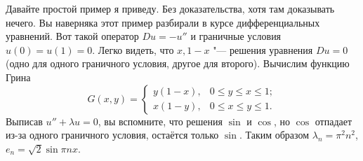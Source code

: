 Давайте простой пример я приведу. Без доказательства, хотя там доказывать нечего. Вы наверняка этот пример разбирали в курсе дифференциальных уравнений. Вот такой оператор $D u = - u''$ и граничные условия $u(0) = u(1) = 0$. Легко видеть, что $x,1-x$ "--- решения уравнения $Du=0$ (одно для одного граничного условия, другое для второго). Вычислим функцию Грина
\[
  G(x,y) = \begin{cases}
  y(1-x),&0\le y\le x\le 1;\\
  x(1-y),&0\le x\le y\le 1.
\end{cases}
\]
Выписав $u'' + \lambda u = 0$, вы вспомните, что решения $\sin$ и $\cos$, но $\cos$ отпадает из-за одного граничного условия, остаётся только $\sin$. Таким образом $\lambda_n = \pi^2 n^2$, $e_n = \sqrt2 \sin\pi nx$.
